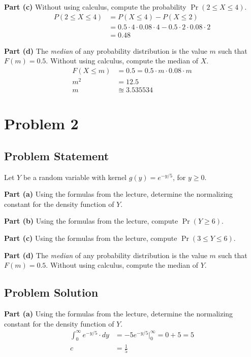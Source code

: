 \documentclass[12pt]{article}
\theoremstyle{definition}
\begin{document}
\bigskip
\noindent
{\bf Part (c)} Without using calculus, compute the probability $\Pr(2 \leq X \leq 4)$.
\begin{align*}
P(2 \leq X \leq 4) &= P(X \leq 4) - P(X \leq 2)\\
&= 0.5 \cdot 4\cdot 0.08 \cdot 4 - 0.5 \cdot 2 \cdot 0.08 \cdot 2\\
&= 0.48
\end{align*}

\bigskip
\noindent
{\bf Part (d)} The {\em median} of any probability distribution is the value $m$ such that $F(m) = 0.5$. Without using calculus, compute the median of $X$.
\begin{align*}
F(X \leq m) &= 0.5 = 0.5 \cdot m \cdot 0.08 \cdot m\\
m^2 &= 12.5\\
m &\approxeq 3.535534
\end{align*}


\newpage
\section*{Problem 2}

\subsection*{Problem Statement}

Let $Y$ be a random variable with kernel $g(y) = e^{-y/5}$, for $y \geq 0$.

\bigskip
\noindent
{\bf Part (a)} Using the formulas from the lecture, determine the normalizing constant for the density function of $Y$.

\bigskip
\noindent
{\bf Part (b)} Using the formulas from the lecture, compute $\Pr( Y \geq 6)$.

\bigskip
\noindent
{\bf Part (c)} Using the formulas from the lecture, compute $\Pr( 3 \leq Y \leq 6)$.


\bigskip
\noindent
{\bf Part (d)} The {\em median} of any probability distribution is the value $m$ such that $F(m) = 0.5$. Without using calculus, compute the median of $Y$.






\subsection*{Problem Solution}
\bigskip
\noindent
{\bf Part (a)} Using the formulas from the lecture, determine the normalizing constant for the density function of $Y$.
\begin{align*}
\int_0^\infty e^{-y/5}\cdot dy &= -5e^{-y/5}\biggr\rvert_0^{\infty} = 0 + 5 = 5\\
c &= \frac{1}{5}
\end{align*}
\end{document}
